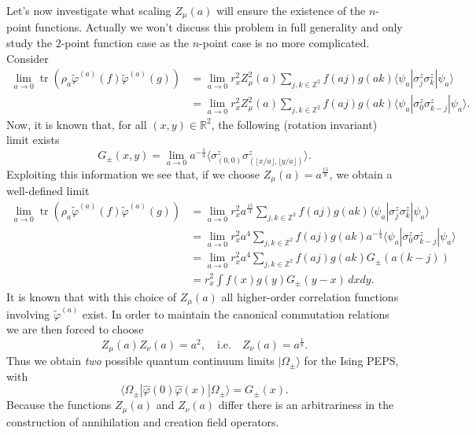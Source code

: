 \documentclass[prl,twocolumn,lengthcheck,superscriptaddress]{revtex4-1}
\newcommand{\tr}{\operatorname{tr}}
\theoremstyle{definition}
\theoremstyle{remark}
\begin{document}
Let's now investigate what scaling $Z_{\mu}(a)$ will ensure the existence of the $n$-point functions. Actually we won't discuss this problem in full generality and only study the $2$-point function case as the $n$-point case is no more complicated. Consider
\begin{equation}
	\begin{split}
	\lim_{a\rightarrow 0} \tr\left(\rho_a \widetilde{\varphi}^{(a)}(f)\widetilde{\varphi}^{(a)}(g)\right) &= \lim_{a\rightarrow 0}r_x^2Z_{\mu}^2(a) \sum_{j,k\in \mathbb{Z}^2} f(aj)g(ak) \langle \psi_a|\sigma^z_j\sigma^z_k|\psi_a\rangle \\
	&= \lim_{a\rightarrow 0}r_x^2Z_{\mu}^2(a) \sum_{j,k\in \mathbb{Z}^2} f(aj)g(ak) \langle\psi_a|\sigma^z_0\sigma^z_{k-j}|\psi_a\rangle.
	\end{split}
\end{equation}
Now, it is known that, for all $(x,y)\in \mathbb{R}^2$, the following (rotation invariant) limit exists
\begin{equation}
	G_{\pm}(x,y) = \lim_{a\rightarrow 0} a^{-\frac{1}{4}} \langle \sigma^z_{(0,0)}\sigma^z_{(\lfloor x/a\rfloor,\lfloor y/a\rfloor)}\rangle.
\end{equation}
Exploiting this information we see that, if we choose $Z_\mu(a) = a^{\frac{15}{8}}$, we obtain a well-defined limit
\begin{equation}
	\begin{split}
	\lim_{a\rightarrow 0} \tr\left(\rho_a \widetilde{\varphi}^{(a)}(f)\widetilde{\varphi}^{(a)}(g)\right) &= \lim_{a\rightarrow 0}r_x^2a^{\frac{15}{4}} \sum_{j,k\in \mathbb{Z}^2} f(aj)g(ak) \langle \psi_a|\sigma^z_j\sigma^z_k|\psi_a\rangle \\
	&= \lim_{a\rightarrow 0}r_x^2a^{4} \sum_{j,k\in \mathbb{Z}^2} f(aj)g(ak) a^{-\frac14}\langle \psi_a|\sigma^z_0\sigma^z_{k-j}|\psi_a\rangle \\
	&= \lim_{a\rightarrow 0}r_x^2a^{4} \sum_{j,k\in \mathbb{Z}^2} f(aj)g(ak) G_{\pm}(a(k-j)) \\
	&= r_x^2 \int f(x)g(y)G_{\pm}(y-x) \, dxdy.
	\end{split}
\end{equation}
It is known \cite{mccoy:1977a} that with this choice of $Z_\mu(a)$ all higher-order correlation functions involving $\widetilde{\varphi}^{(a)}$ exist.
In order to maintain the canonical commutation relations we are then forced to choose  
\begin{equation}
	Z_\mu(a)Z_\nu(a) = a^2, \quad \text{i.e.} \quad Z_{\nu}(a) = a^{\frac18}.
\end{equation}
Thus we obtain \emph{two} possible quantum continuum limits $|\Omega_{\pm}\rangle$ for the Ising PEPS, with
\begin{equation}
	\langle \Omega_{\pm}|\widehat{\varphi}(0)\widehat{\varphi}(x)|\Omega_{\pm}\rangle = G_{\pm}(x).
\end{equation}
Because the functions $Z_{\mu}(a)$ and $Z_{\nu}(a)$ differ there is an arbitrariness in the construction of annihilation and creation field operators. 
\end{document}
